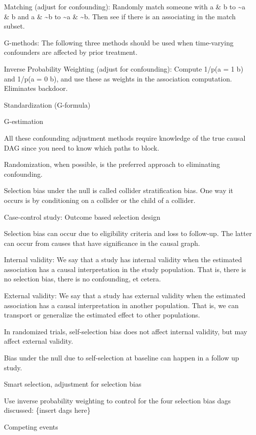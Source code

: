 \documentclass[]{book}
\begin{document}
Matching (adjust for confounding): Randomly match someone with a \& b to \textasciitilde{}a \& b and a \& \textasciitilde{}b to \textasciitilde{}a \& \textasciitilde{}b. Then see if there is an associating in the match subset.

G-methods: The following three methods should be used when time-varying confounders are affected by prior treatment.

Inverse Probability Weighting (adjust for confounding): Compute 1/p(a = 1 \textbar{} b) and 1/p(a = 0 \textbar{} b), and use these as weights in the association computation. Eliminates backdoor.

Standardization (G-formula)

G-estimation

All these confounding adjustment methods require knowledge of the true causal DAG since you need to know which paths to block.

Randomization, when possible, is the preferred approach to eliminating confounding.

Selection bias under the null is called collider stratification bias. One way it occurs is by conditioning on a collider or the child of a collider.

Case-control study: Outcome based selection design

Selection bias can occur due to eligibility criteria and loss to follow-up. The latter can occur from causes that have significance in the causal graph.

Internal validity: We say that a study has internal validity when the estimated association has a causal interpretation in the study population. That is, there is no selection bias, there is no confounding, et cetera.

External validity: We say that a study has external validity when the estimated association has a causal interpretation in another population. That is, we can transport or generalize the estimated effect to other populations.

In randomized trials, self-selection bias does not affect internal validity, but may affect external validity.

Bias under the null due to self-selection at baseline can happen in a follow up study.

Smart selection, adjustment for selection bias

Use inverse probability weighting to control for the four selection bias dags discussed: \{insert dags here\}

Competing events
\end{document}
